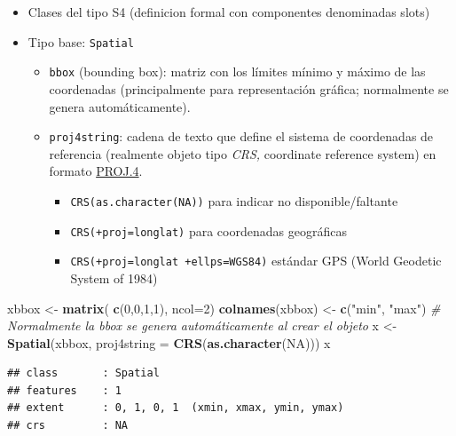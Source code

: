 \documentclass[
]{book}
\newenvironment{Shaded}{\begin{snugshade}}{\end{snugshade}}
\newcommand{\AttributeTok}[1]{\textcolor[rgb]{0.13,0.29,0.53}{#1}}
\newcommand{\CommentTok}[1]{\textcolor[rgb]{0.56,0.35,0.01}{\textit{#1}}}
\newcommand{\ConstantTok}[1]{\textcolor[rgb]{0.56,0.35,0.01}{#1}}
\newcommand{\DecValTok}[1]{\textcolor[rgb]{0.00,0.00,0.81}{#1}}
\newcommand{\FunctionTok}[1]{\textcolor[rgb]{0.13,0.29,0.53}{\textbf{#1}}}
\newcommand{\NormalTok}[1]{#1}
\newcommand{\OtherTok}[1]{\textcolor[rgb]{0.56,0.35,0.01}{#1}}
\newcommand{\StringTok}[1]{\textcolor[rgb]{0.31,0.60,0.02}{#1}}
\theoremstyle{break}
\theoremstyle{definition}
\theoremstyle{definition}
\theoremstyle{definition}
\theoremstyle{definition}
\theoremstyle{remark}
\begin{document}
\begin{itemize}
\item
  Clases del tipo S4 (definicion formal con componentes
  denominadas slots)
\item
  Tipo base: \texttt{Spatial}

  \begin{itemize}
  \item
    \texttt{bbox} (bounding box): matriz con los límites mínimo y máximo de
    las coordenadas (principalmente para representación gráfica;
    normalmente se genera automáticamente).
  \item
    \texttt{proj4string}: cadena de texto que define el sistema de
    coordenadas de referencia (realmente objeto tipo \emph{CRS,}
    coordinate reference system) en formato
    \href{http://trac.osgeo.org/proj}{PROJ.4}.

    \begin{itemize}
    \item
      \texttt{CRS(as.character(NA))} para indicar no disponible/faltante
    \item
      \texttt{CRS(+proj=longlat)} para coordenadas geográficas
    \item
      \texttt{CRS(+proj=longlat\ +ellps=WGS84)} estándar GPS (World
      Geodetic System of 1984)
    \end{itemize}
  \end{itemize}
\end{itemize}

\begin{Shaded}
\begin{Highlighting}[]
\NormalTok{xbbox }\OtherTok{\textless{}{-}} \FunctionTok{matrix}\NormalTok{( }\FunctionTok{c}\NormalTok{(}\DecValTok{0}\NormalTok{,}\DecValTok{0}\NormalTok{,}\DecValTok{1}\NormalTok{,}\DecValTok{1}\NormalTok{), }\AttributeTok{ncol=}\DecValTok{2}\NormalTok{)}
\FunctionTok{colnames}\NormalTok{(xbbox) }\OtherTok{\textless{}{-}} \FunctionTok{c}\NormalTok{(}\StringTok{"min"}\NormalTok{, }\StringTok{"max"}\NormalTok{) }\CommentTok{\# Normalmente la bbox se genera automáticamente al crear el objeto}
\NormalTok{x }\OtherTok{\textless{}{-}} \FunctionTok{Spatial}\NormalTok{(xbbox, }\AttributeTok{proj4string =} \FunctionTok{CRS}\NormalTok{(}\FunctionTok{as.character}\NormalTok{(}\ConstantTok{NA}\NormalTok{)))}
\NormalTok{x}
\end{Highlighting}
\end{Shaded}

\begin{verbatim}
## class       : Spatial 
## features    : 1 
## extent      : 0, 1, 0, 1  (xmin, xmax, ymin, ymax)
## crs         : NA
\end{verbatim}
\end{document}
